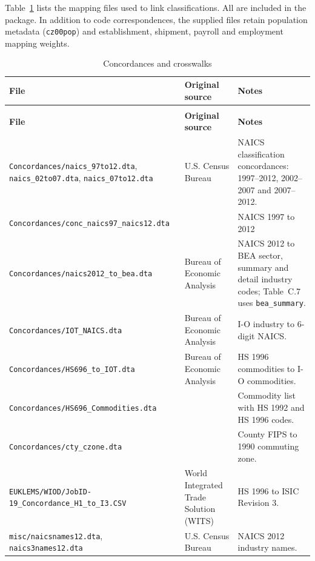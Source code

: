 \documentclass[11pt]{article}
\newcommand{\pkgfile}[1]{\nolinkurl{#1}}
\begin{document}
Table~\ref{tab:conc} lists the mapping files used to link classifications. All are
included in the package. In addition to code correspondences, the supplied files
retain population metadata (\texttt{cz00pop}) and establishment, shipment,
payroll and employment mapping weights.

{\small\renewcommand{\arraystretch}{1.15}\setlength{\extrarowheight}{2pt}
\begin{longtable}{@{}>{\raggedright\arraybackslash}p{4.6cm}
                    >{\raggedright\arraybackslash}p{4.4cm}
                    >{\raggedright\arraybackslash}p{5.9cm}@{}}
\caption{Concordances and crosswalks\label{tab:conc}}\\
\toprule
\textbf{File} & \textbf{Original source} & \textbf{Notes}\\
\midrule
\endfirsthead
\multicolumn{3}{@{}l}{\emph{Table \ref{tab:conc} continued}}\\
\toprule
\textbf{File} & \textbf{Original source} & \textbf{Notes}\\
\midrule
\endhead
\bottomrule
\endfoot

\pkgfile{Concordances/naics_97to12.dta}, \pkgfile{naics_02to07.dta}, \pkgfile{naics_07to12.dta}
& U.S. Census Bureau
& NAICS classification concordances: 1997--2012, 2002--2007 and 2007--2012.\\[7pt]

\pkgfile{Concordances/conc_naics97_naics12.dta}
& \citet{nberces5818}
& NAICS 1997 to 2012\\[7pt]

\pkgfile{Concordances/naics2012_to_bea.dta}
& Bureau of Economic Analysis
& NAICS 2012 to BEA sector, summary and detail industry codes; Table~C.7 uses \texttt{bea\_summary}.\\[7pt]

\pkgfile{Concordances/IOT_NAICS.dta}
& Bureau of Economic Analysis
& I-O industry to 6-digit NAICS.\\[7pt]

\pkgfile{Concordances/HS696_to_IOT.dta}
& Bureau of Economic Analysis
& HS 1996 commodities to I-O commodities. \\[7pt]

\pkgfile{Concordances/HS696_Commodities.dta}
& \citet{fally}
& Commodity list with HS 1992 and HS 1996 codes.\\[7pt]

\pkgfile{Concordances/cty_czone.dta}
& \citet{dorn2009}
& County FIPS to 1990 commuting zone.\\[7pt]

\pkgfile{EUKLEMS/WIOD/JobID-19_Concordance_H1_to_I3.CSV}
& World Integrated Trade Solution (WITS)
& HS 1996 to ISIC Revision 3.\\[7pt]

\pkgfile{misc/naicsnames12.dta}, \pkgfile{naics3names12.dta}
& U.S. Census Bureau
& NAICS 2012 industry names.\\
\end{longtable}
}
\end{document}
